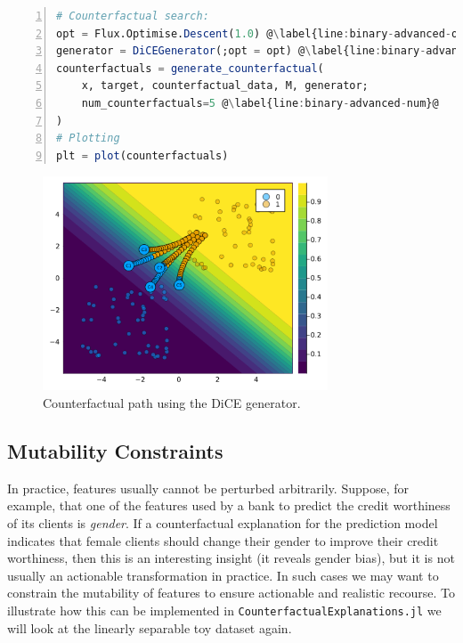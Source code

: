 \documentclass[
  letterpaper,
  DIV=11,
  numbers=noendperiod]{scrartcl}
\begin{document}
\begin{lstlisting}[language=Julia, escapechar=@, numbers=left, label={lst:binary-advanced}, caption={}]
# Counterfactual search:
opt = Flux.Optimise.Descent(1.0) @\label{line:binary-advanced-opt}@
generator = DiCEGenerator(;opt = opt) @\label{line:binary-advanced-dice}@
counterfactuals = generate_counterfactual(
    x, target, counterfactual_data, M, generator;
    num_counterfactuals=5 @\label{line:binary-advanced-num}@
)
# Plotting
plt = plot(counterfactuals)
\end{lstlisting}

\begin{figure}

{\centering \includegraphics[width=3.33333in,height=2.5in]{www/binary_advanced.png}

}

\caption{\label{fig-binary-advanced}Counterfactual path using the DiCE
generator.}

\end{figure}

\hypertarget{mutability-constraints}{%
\subsection{Mutability Constraints}\label{mutability-constraints}}

In practice, features usually cannot be perturbed arbitrarily. Suppose,
for example, that one of the features used by a bank to predict the
credit worthiness of its clients is \emph{gender}. If a counterfactual
explanation for the prediction model indicates that female clients
should change their gender to improve their credit worthiness, then this
is an interesting insight (it reveals gender bias), but it is not
usually an actionable transformation in practice. In such cases we may
want to constrain the mutability of features to ensure actionable and
realistic recourse. To illustrate how this can be implemented in
\texttt{CounterfactualExplanations.jl} we will look at the linearly
separable toy dataset again.
\end{document}
